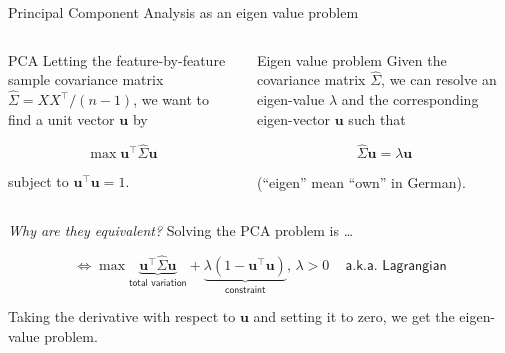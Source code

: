 \documentclass[
  ignorenonframetext,
  aspectratio=169]{beamer}
\begin{document}
\begin{frame}{Principal Component Analysis as an eigen value problem}
\protect\hypertarget{principal-component-analysis-as-an-eigen-value-problem}{}
\begin{columns}[T]
\begin{column}{.45\textwidth}
\begin{block}{PCA}
\protect\hypertarget{pca}{}
Letting the feature-by-feature sample covariance matrix
\(\hat{\Sigma} = XX^{\top}/(n-1)\), we want to find a unit vector
\(\mathbf{u}\) by

\[\max \mathbf{u}^{\top} \hat{\Sigma}\mathbf{u}\]

subject to \(\mathbf{u}^{\top}\mathbf{u} = 1\).
\end{block}
\end{column}

\begin{column}{.45\textwidth}
\begin{block}{Eigen value problem}
\protect\hypertarget{eigen-value-problem}{}
Given the covariance matrix \(\hat{\Sigma}\), we can resolve an
eigen-value \(\lambda\) and the corresponding eigen-vector
\(\mathbf{u}\) such that

\[\hat{\Sigma}\mathbf{u} = \lambda \mathbf{u}\]

(``eigen'' mean ``own'' in German).
\end{block}
\end{column}
\end{columns}

\emph{Why are they equivalent?} Solving the PCA problem is \ldots{}

\[\iff \max \underbrace{\mathbf{u}^{\top}\hat{\Sigma}\mathbf{u}}_{\textsf{total variation}} + \underbrace{\lambda\left(1 - \mathbf{u}^{\top}\mathbf{u}\right)}_{\textsf{constraint}},\,\lambda >0\,\quad\textsf{a.k.a. Lagrangian}\]

Taking the derivative with respect to \(\mathbf{u}\) and setting it to
zero, we get the eigen-value problem.
\end{frame}
\end{document}
